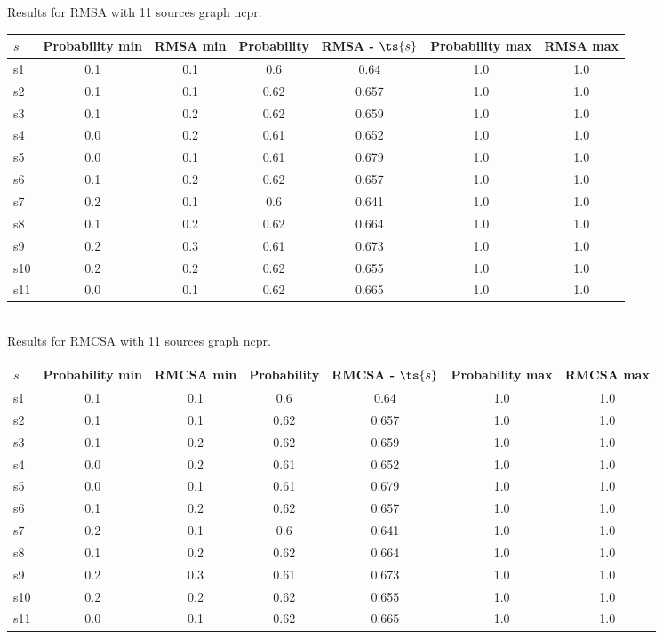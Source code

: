 \documentclass{article}
\begin{document}
\noindent Results for RMSA with 11 sources graph ncpr.

\noindent\begin{tabular}{|l|c|c|c|c|c|c|}
\hline
$s$& Probability min & RMSA min & Probability & RMSA - $\ts{s}$ & Probability max & RMSA max\\
\hline
s1 &0.1 & 0.1 & 0.6 & 0.64 & 1.0 & 1.0\\
\hline
s2 &0.1 & 0.1 & 0.62 & 0.657 & 1.0 & 1.0\\
\hline
s3 &0.1 & 0.2 & 0.62 & 0.659 & 1.0 & 1.0\\
\hline
s4 &0.0 & 0.2 & 0.61 & 0.652 & 1.0 & 1.0\\
\hline
s5 &0.0 & 0.1 & 0.61 & 0.679 & 1.0 & 1.0\\
\hline
s6 &0.1 & 0.2 & 0.62 & 0.657 & 1.0 & 1.0\\
\hline
s7 &0.2 & 0.1 & 0.6 & 0.641 & 1.0 & 1.0\\
\hline
s8 &0.1 & 0.2 & 0.62 & 0.664 & 1.0 & 1.0\\
\hline
s9 &0.2 & 0.3 & 0.61 & 0.673 & 1.0 & 1.0\\
\hline
s10 &0.2 & 0.2 & 0.62 & 0.655 & 1.0 & 1.0\\
\hline
s11 &0.0 & 0.1 & 0.62 & 0.665 & 1.0 & 1.0\\
\hline
\end{tabular}\\

\noindent Results for RMCSA with 11 sources graph ncpr.

\noindent\begin{tabular}{|l|c|c|c|c|c|c|}
\hline
$s$& Probability min & RMCSA min & Probability & RMCSA - $\ts{s}$ & Probability max & RMCSA max\\
\hline
s1 &0.1 & 0.1 & 0.6 & 0.64 & 1.0 & 1.0\\
\hline
s2 &0.1 & 0.1 & 0.62 & 0.657 & 1.0 & 1.0\\
\hline
s3 &0.1 & 0.2 & 0.62 & 0.659 & 1.0 & 1.0\\
\hline
s4 &0.0 & 0.2 & 0.61 & 0.652 & 1.0 & 1.0\\
\hline
s5 &0.0 & 0.1 & 0.61 & 0.679 & 1.0 & 1.0\\
\hline
s6 &0.1 & 0.2 & 0.62 & 0.657 & 1.0 & 1.0\\
\hline
s7 &0.2 & 0.1 & 0.6 & 0.641 & 1.0 & 1.0\\
\hline
s8 &0.1 & 0.2 & 0.62 & 0.664 & 1.0 & 1.0\\
\hline
s9 &0.2 & 0.3 & 0.61 & 0.673 & 1.0 & 1.0\\
\hline
s10 &0.2 & 0.2 & 0.62 & 0.655 & 1.0 & 1.0\\
\hline
s11 &0.0 & 0.1 & 0.62 & 0.665 & 1.0 & 1.0\\
\hline
\end{tabular}\\
\end{document}
